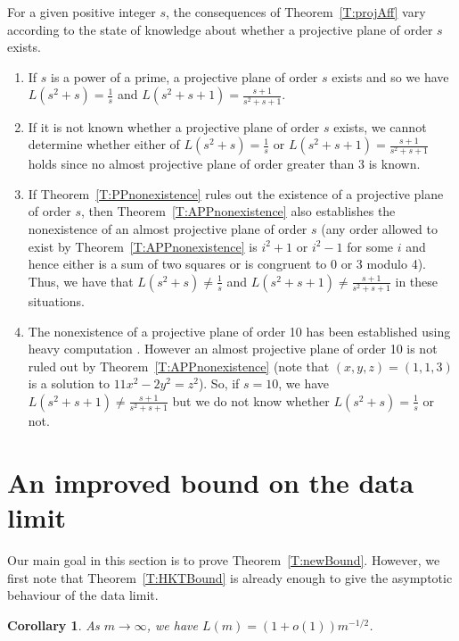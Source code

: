 \documentclass[11pt]{article}
\newtheorem{Corollary}[Theorem]{Corollary}
\theoremstyle{definition}
\begin{document}
For a given positive integer $s$, the consequences of Theorem~\ref{T:projAff} vary according to the state of knowledge about whether a projective plane of order $s$ exists.
\begin{enumerate}
    \item
If $s$ is a power of a prime, a projective plane of order $s$ exists and so we have $L(s^2+s)=\frac{1}{s}$ and $L(s^2+s+1)=\frac{s+1}{s^2+s+1}$.
    \item
If it is not known whether a projective plane of order $s$ exists, we cannot determine whether either of $L(s^2+s)=\frac{1}{s}$ or $L(s^2+s+1)=\frac{s+1}{s^2+s+1}$ holds since no almost projective plane of order greater than 3 is known.
    \item
If Theorem~\ref{T:PPnonexistence} rules out the existence of a projective plane of order $s$, then Theorem~\ref{T:APPnonexistence} also establishes the nonexistence of an almost projective plane of order $s$ (any order allowed to exist by Theorem~\ref{T:APPnonexistence} is $i^2+1$ or $i^2-1$ for some $i$ and hence either is a sum of two squares or is congruent to 0 or 3 modulo 4). Thus, we have that $L(s^2+s) \neq \frac{1}{s}$ and $L(s^2+s+1) \neq \frac{s+1}{s^2+s+1}$ in these situations.
    \item
The nonexistence of a projective plane of order 10 has been established using heavy computation \cite{LamThiSwi}. However an almost projective plane of order 10 is not ruled out by Theorem~\ref{T:APPnonexistence} (note that $(x,y,z)=(1,1,3)$ is a solution to $11x^2-2y^2=z^2$). So, if $s=10$, we have $L(s^2+s+1) \neq \frac{s+1}{s^2+s+1}$ but we do not know whether $L(s^2+s) = \frac{1}{s}$ or not.
\end{enumerate}


\section{An improved bound on the data limit}\label{S:newCBound}

Our main goal in this section is to prove Theorem~\ref{T:newBound}. However, we first note that Theorem~\ref{T:HKTBound} is already enough to give the asymptotic behaviour of the data limit.

\begin{Corollary}
As $m \rightarrow \infty$, we have $L(m) = (1+o(1))m^{-1/2}$.
\end{Corollary}
\end{document}
